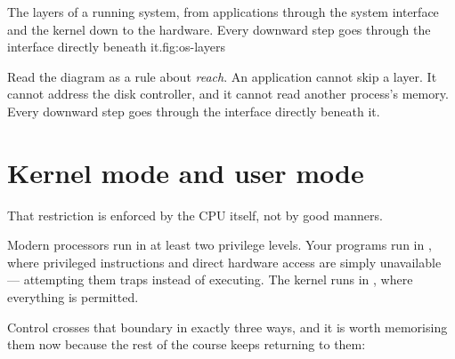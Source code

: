 \begin{utpfig}{The layers of a running system, from applications through the system interface and the kernel down to the hardware. Every downward step goes through the interface directly beneath it.}{fig:os-layers}
\end{utpfig}

Read the diagram as a rule about \emph{reach}. An application cannot skip a layer. It cannot address the disk controller, and it cannot read another process's memory. Every downward step goes through the interface directly beneath it.

\section*{Kernel mode and user mode}
That restriction is enforced by the CPU itself, not by good manners.

Modern processors run in at least two privilege levels. Your programs run in , where privileged instructions and direct hardware access are simply unavailable --- attempting them traps instead of executing. The kernel runs in , where everything is permitted.

Control crosses that boundary in exactly three ways, and it is worth memorising them now because the rest of the course keeps returning to them:

